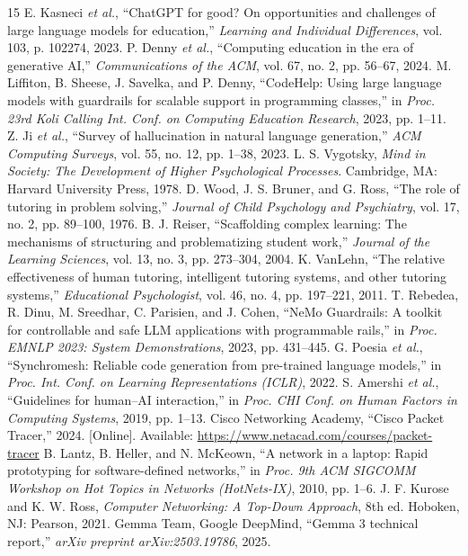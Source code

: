 \documentclass[conference,a4paper]{IEEEtran}
\begin{document}
\balance
\begin{thebibliography}{15}
 E. Kasneci \emph{et al.}, ``ChatGPT for good? On opportunities and challenges of large language models for education,'' \emph{Learning and Individual Differences}, vol. 103, p. 102274, 2023.
 P. Denny \emph{et al.}, ``Computing education in the era of generative AI,'' \emph{Communications of the ACM}, vol. 67, no. 2, pp. 56--67, 2024.
 M. Liffiton, B. Sheese, J. Savelka, and P. Denny, ``CodeHelp: Using large language models with guardrails for scalable support in programming classes,'' in \emph{Proc. 23rd Koli Calling Int. Conf. on Computing Education Research}, 2023, pp. 1--11.
 Z. Ji \emph{et al.}, ``Survey of hallucination in natural language generation,'' \emph{ACM Computing Surveys}, vol. 55, no. 12, pp. 1--38, 2023.
 L. S. Vygotsky, \emph{Mind in Society: The Development of Higher Psychological Processes}. Cambridge, MA: Harvard University Press, 1978.
 D. Wood, J. S. Bruner, and G. Ross, ``The role of tutoring in problem solving,'' \emph{Journal of Child Psychology and Psychiatry}, vol. 17, no. 2, pp. 89--100, 1976.
 B. J. Reiser, ``Scaffolding complex learning: The mechanisms of structuring and problematizing student work,'' \emph{Journal of the Learning Sciences}, vol. 13, no. 3, pp. 273--304, 2004.
 K. VanLehn, ``The relative effectiveness of human tutoring, intelligent tutoring systems, and other tutoring systems,'' \emph{Educational Psychologist}, vol. 46, no. 4, pp. 197--221, 2011.
 T. Rebedea, R. Dinu, M. Sreedhar, C. Parisien, and J. Cohen, ``NeMo Guardrails: A toolkit for controllable and safe LLM applications with programmable rails,'' in \emph{Proc. EMNLP 2023: System Demonstrations}, 2023, pp. 431--445.
 G. Poesia \emph{et al.}, ``Synchromesh: Reliable code generation from pre-trained language models,'' in \emph{Proc. Int. Conf. on Learning Representations (ICLR)}, 2022.
 S. Amershi \emph{et al.}, ``Guidelines for human--AI interaction,'' in \emph{Proc. CHI Conf. on Human Factors in Computing Systems}, 2019, pp. 1--13.
 Cisco Networking Academy, ``Cisco Packet Tracer,'' 2024. [Online]. Available: \url{https://www.netacad.com/courses/packet-tracer}
 B. Lantz, B. Heller, and N. McKeown, ``A network in a laptop: Rapid prototyping for software-defined networks,'' in \emph{Proc. 9th ACM SIGCOMM Workshop on Hot Topics in Networks (HotNets-IX)}, 2010, pp. 1--6.
 J. F. Kurose and K. W. Ross, \emph{Computer Networking: A Top-Down Approach}, 8th ed. Hoboken, NJ: Pearson, 2021.
 Gemma Team, Google DeepMind, ``Gemma 3 technical report,'' \emph{arXiv preprint arXiv:2503.19786}, 2025.
\end{thebibliography}
\end{document}

